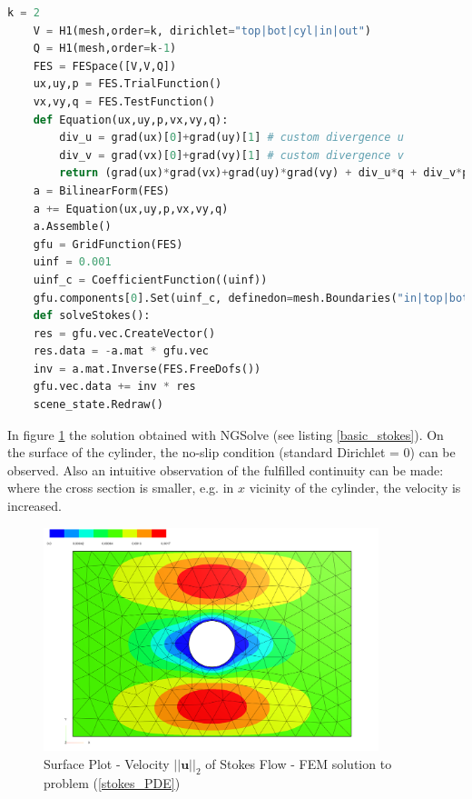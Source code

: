\pagebreak

\begin{lstlisting}[language=Python, title=Basic Stokes PDE's with NGSolve in Python, label=basic_stokes]
    k = 2
    V = H1(mesh,order=k, dirichlet="top|bot|cyl|in|out")
    Q = H1(mesh,order=k-1)
    FES = FESpace([V,V,Q])
    ux,uy,p = FES.TrialFunction()
    vx,vy,q = FES.TestFunction()
    def Equation(ux,uy,p,vx,vy,q):
        div_u = grad(ux)[0]+grad(uy)[1] # custom divergence u
        div_v = grad(vx)[0]+grad(vy)[1] # custom divergence v
        return (grad(ux)*grad(vx)+grad(uy)*grad(vy) + div_u*q + div_v*p)* dx
    a = BilinearForm(FES)
    a += Equation(ux,uy,p,vx,vy,q)
    a.Assemble()
    gfu = GridFunction(FES)
    uinf = 0.001
    uinf_c = CoefficientFunction((uinf))
    gfu.components[0].Set(uinf_c, definedon=mesh.Boundaries("in|top|bot|out"))
    def solveStokes():
    res = gfu.vec.CreateVector()
    res.data = -a.mat * gfu.vec
    inv = a.mat.Inverse(FES.FreeDofs())
    gfu.vec.data += inv * res
    scene_state.Redraw()
\end{lstlisting}

In figure \ref{basic_stokes_flow_plot} the solution obtained with NGSolve (see listing \ref{basic_stokes}). On the surface of the cylinder, 
the no-slip condition (standard Dirichlet = 0) can be observed. Also an intuitive observation of the fulfilled continuity can be made:
where the cross section is smaller, e.g. in $x$ vicinity of the cylinder, the velocity is increased.
\begin{figure}[h]
    \centering
    \includegraphics[width=0.87\textwidth]{figures/solution_stokes_basic.PNG}
	\caption{Surface Plot - Velocity $||\mathbf{u}||_2$ of Stokes Flow - FEM solution to problem (\ref{stokes_PDE})}
	\label{basic_stokes_flow_plot}
\end{figure}

\pagebreak